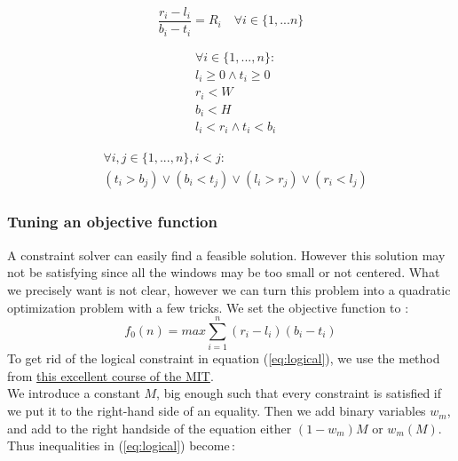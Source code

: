 \documentclass{acmtog}
\begin{document}
\begin{equation}
\dfrac{r_i - l_i}{b_i - t_i} = R_i \quad \forall  i \in  \{1, ... n\}
\end{equation}

\begin{equation}
\begin{split}
&\forall  i \in  \{1, ... ,n\}  :\\
&l_i \geq 0 \wedge t_i \geq 0 \\
&r_i < W \\
&b_i  < H  \\
&l_i < r_i \wedge t_i < b_i
\end{split}
\end{equation}


\begin{equation}
\begin{split}
&\forall i, j \in \{1,..., n\}, i < j : \\
&(t_i > b_j) \lor (b_i < t_j) \lor (l_i > r_j) \lor (r_i < l_j)
\end{split}
\label{eq:logical}
\end{equation}

\subsubsection{Tuning an objective function}
A constraint solver can easily find a feasible solution. However this solution may not be satisfying since all the windows may be too small or not centered. What we precisely want is not clear, however we can turn this problem into a quadratic optimization problem with a few tricks. We set the objective function  to :\\
\begin{equation}
f_0(n) = max \sum_{i=1}^{n}{(r_i-l_i)(b_i-t_i)}
\label{eq:objective}
\end{equation}
To get rid of the logical constraint in equation (\ref{eq:logical}), we use the method from \href{https://ocw.mit.edu/courses/sloan-school-of-management/15-053-optimization-methods-in-management-science-spring-2013/lecture-notes/MIT15_053S13_lec11.pdf}{this excellent course of the MIT}.\\ 
We introduce a constant $M$, big enough such that every constraint is satisfied if we put it to the right-hand side of an equality. Then we add binary variables $w_m$, and add to the right handside of the equation either $(1-w_m) M$ or  $w_m(M)$. Thus inequalities in (\ref{eq:logical}) become\,: 
\end{document}
